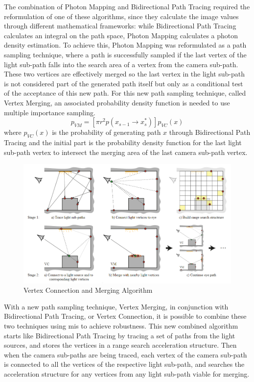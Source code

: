 The combination of Photon Mapping and Bidirectional Path Tracing required the reformulation of one of these algorithms, since they calculate the image values through different mathematical frameworks: while Bidirectional Path Tracing calculates an integral on the path space, Photon Mapping calculates a photon density estimation. To achieve this, Photon Mapping was reformulated as a path sampling technique, where a path is successfully sampled if the last vertex of the light sub-path falls into the search area of a vertex from the camera sub-path. These two vertices are effectively merged so the last vertex in the light sub-path is not considered part of the generated path itself but only as a conditional test of the acceptance of this new path. For this new path sampling technique, called Vertex Merging, an associated probability density function is needed to use multiple importance sampling. 
\begin{equation}
p_{VM}=[\pi r^2 p(x_{s-1}\xrightarrow{}x_{s}^{*})]p_{VC}(x)
\label{eq:pvm}
\end{equation}
where $p_{VC}(x)$ is the probability of generating path $x$ through Bidirectional Path Tracing and the initial part is the probability density function for the last light sub-path vertex to intersect the merging area of the last camera sub-path vertex.

\begin{figure}[H]
\centering
\includegraphics[width=\linewidth]{img/vcmDiagram.png}
\caption{\label{img:vcmdiag} Vertex Connection and Merging Algorithm}
\end{figure}

With a new path sampling technique, Vertex Merging, in conjunction with Bidirectional Path Tracing, or Vertex Connection, it is possible to combine these two techniques using \gls{mis} to achieve robustness. This new combined algorithm starts like Bidirectional Path Tracing by tracing a set of paths from the light sources, and stores the vertices in a range search acceleration structure. Then when the camera sub-paths are being traced, each vertex of the camera sub-path is connected to all the vertices of the respective light sub-path, and searches the acceleration structure for any vertices from any light sub-path viable for merging.

